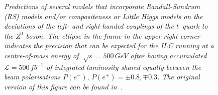 \begin{figure}[H]
\caption{\sl Predictions of several models that incorporate Randall-Sundrum (RS) models and/or compositeness or Little Higgs models on the deviations of the left- and right-handed couplings of the $t$~quark to the $Z^0$ boson. The ellipse in the frame in the upper right corner indicates the precision that can be expected for the ILC running at a centre-of-mass energy of $\sqrt[]{s} = 500\,GeV$ after having accumulated ${\mathcal L}=500\,fb^{-1}$ of integrated luminosity shared equally between the beam polarisations $P(e^-),\,P(e^+) =\pm0.8,\mp0.3$. The original version of this figure can be found in~\cite{bib:ILCTOP}.}
\label{fig:models-rp}
\end{figure}